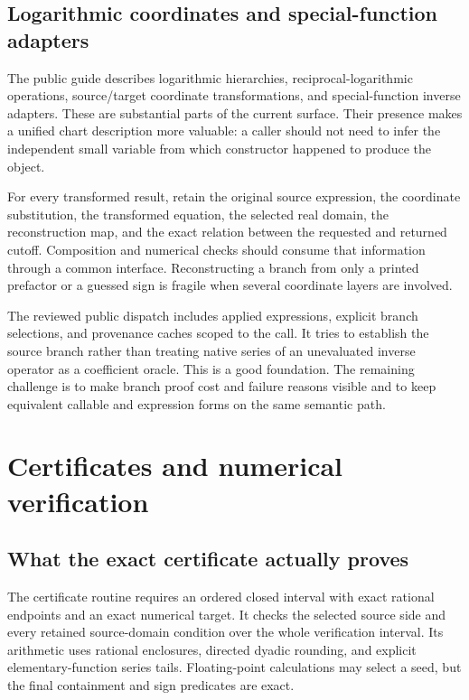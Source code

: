 \documentclass[11pt,a4paper]{article}
\newcommand{\code}[1]{\texttt{\detokenize{#1}}}
\theoremstyle{definition}
\begin{document}
\subsection{Logarithmic coordinates and special-function adapters}

The public guide describes logarithmic hierarchies, reciprocal-logarithmic operations, source/target coordinate transformations, and special-function inverse adapters. These are substantial parts of the current surface. Their presence makes a unified chart description more valuable: a caller should not need to infer the independent small variable from which constructor happened to produce the object.\cite{guide}

For every transformed result, retain the original source expression, the coordinate substitution, the transformed equation, the selected real domain, the reconstruction map, and the exact relation between the requested and returned cutoff. Composition and numerical checks should consume that information through a common interface. Reconstructing a branch from only a printed prefactor or a guessed sign is fragile when several coordinate layers are involved.

The reviewed public dispatch includes applied \code{InverseFunction} expressions, explicit branch selections, and provenance caches scoped to the call. It tries to establish the source branch rather than treating native series of an unevaluated inverse operator as a coefficient oracle. This is a good foundation. The remaining challenge is to make branch proof cost and failure reasons visible and to keep equivalent callable and expression forms on the same semantic path.\cite{inverseexpressions}

\section{Certificates and numerical verification}
\label{sec:certificates}

\subsection{What the exact certificate actually proves}

The certificate routine requires an ordered closed interval with exact rational endpoints and an exact numerical target. It checks the selected source side and every retained source-domain condition over the whole verification interval. Its arithmetic uses rational enclosures, directed dyadic rounding, and explicit elementary-function series tails. Floating-point calculations may select a seed, but the final containment and sign predicates are exact.\cite{certificates}
\end{document}
